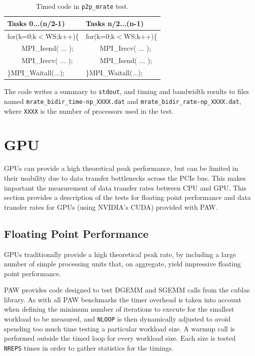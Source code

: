 \documentclass[10pt,a4paper]{report}
\begin{document}
\begin{table}[ht]
\centering
\caption{Timed code in \texttt{p2p\_mrate} test.}
\label{tab:mrate_bdr}
\begin{tabular}{|l|l|}
\hline
\bf{Tasks 0...(n/2-1)}	      & \bf{Tasks n/2...(n-1)}\\\hline
for(k=0;k$<$WS;k++)\{          & for(k=0;k$<$WS;k++)\{ \\
\verb+    +MPI\_Isend( ... );  & \verb+    +MPI\_Irecv( ... );\\
\verb+    +MPI\_Irecv( ... );  & \verb+    +MPI\_Isend( ... );\\
\}MPI\_Waitall(...);    & \}MPI\_Waitall(...);\\\hline
\end{tabular}
\end{table}

The code writes a summary to \verb+stdout+, and timing and bandwidth results to files named \verb+mrate_bidir_time-np_XXXX.dat+ and \verb+mrate_bidir_rate-np_XXXX.dat+, where \verb+XXXX+ is the number of processors used in the test.

\FloatBarrier
\chapter{GPU}
GPUs can provide a high theoretical peak performance, but can be limited in their usability due to data transfer bottlenecks across the PCIe bus. This makes important the measurement of data transfer rates between CPU and GPU. This section provides a description of the tests for floating point performance and data transfer rates for GPUs (using NVIDIA's CUDA) provided with PAW.

\section{Floating Point Performance}
\label{sec:gpu_fp}
GPUs traditionally provide a high theoretical peak rate, by including a large number of simple processing units that, on aggregate, yield impressive floating point performance.

PAW provides code designed to test DGEMM and SGEMM calls from the cublas library. As with all PAW benchmarks the timer overhead is taken into account when defining the minimum number of iterations to execute for the smallest workload to be measured, and \verb+NLOOP+ is then dynamically adjusted to avoid spending too much time testing a particular workload size. A warmup call is performed outside the timed loop for every workload size. Each size is tested \verb+NREPS+ times in order to gather statistics for the timings.
\end{document}
